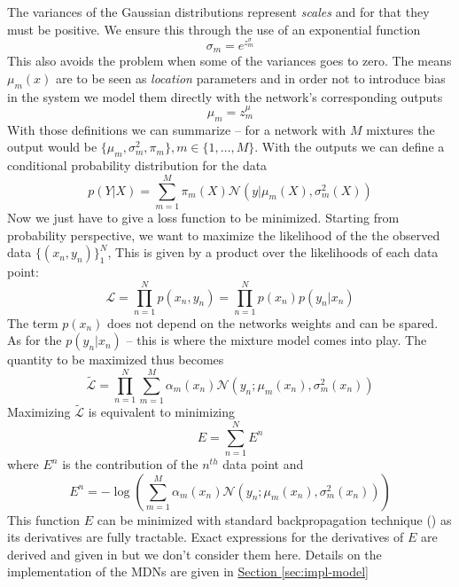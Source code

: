 \documentclass[12pt,a4paper,twoside]{scrartcl}
\numberwithin{equation}{section}
\newcommand{\refsec}[1]{\hyperref[#1]{Section \ref*{#1}}}
\begin{document}
The variances of the Gaussian distributions represent \emph{scales} and for that they must be positive. We ensure this through the use of an exponential function
\begin{equation}
  \sigma_m = e^{z_m^{\sigma}}
\end{equation}
This also avoids the problem when some of the variances goes to zero. The means \(\mu_m(x)\) are to be seen as \emph{location} parameters and in order not to introduce bias in the system we model them directly with the network's corresponding outputs
\begin{equation}
  \mu_m = z_m^{\mu} 
\end{equation}
With those definitions we can summarize -- for a network with \(M\) mixtures the output would be \(\{\mu_m, \sigma_m^2, \pi_m \}, m\in\{1,\ldots ,M\}\). With the outputs we can define a conditional probability distribution for the data
\begin{equation}
  p(Y|X) = \sum_{m=1}^M \pi_m(X)\mathcal{N}(y|\mu_m(X), \sigma_m^2(X))
\end{equation}
Now we just have to give a loss function to be minimized. Starting from probability perspective, we want to maximize the likelihood of the the observed data \(\{(x_n, y_n)\}_1^N\), This is given by a product over the likelihoods of each data point:
\begin{equation}
  \mathcal{L} = \prod_{n=1}^N p(x_n, y_n) = \prod_{n=1}^N p(x_n)p(y_n | x_n)
\end{equation}
The term \(p(x_n)\) does not depend on the networks weights and can be spared. As for the \(p(y_n | x_n)\) -- this is where the mixture model comes into play. The quantity to be maximized thus becomes
\begin{equation}
  \tilde{\mathcal{L}} =  \prod_{n=1}^N \sum_{m=1}^M \alpha_m(x_n)\mathcal{N}(y_n; \mu_m(x_n), \sigma_m^2(x_n))
\end{equation}
Maximizing \(\tilde{\mathcal{L}}\) is equivalent to minimizing
\begin{equation}
  \label{eq:log-like-sum-1}
  E = \sum_{n=1}^NE^n
\end{equation}
where \(E^n\) is the contribution of the \(n^{th}\) data point and
\begin{equation}
  \label{eq:log-like-sum-2}
  E^n = -\log(\sum_{m=1}^M \alpha_m(x_n)\mathcal{N}(y_n; \mu_m(x_n), \sigma_m^2(x_n)))
\end{equation}
This function \(E\) can be minimized with standard backpropagation technique (\cite{bertels2001}) as its derivatives are fully tractable. Exact expressions for the derivatives of \(E\) are derived and given in \cite{bishop1994} but we don't consider them here. Details on the implementation of the MDNs are given in \refsec{sec:impl-model}
\clearpage
\end{document}
